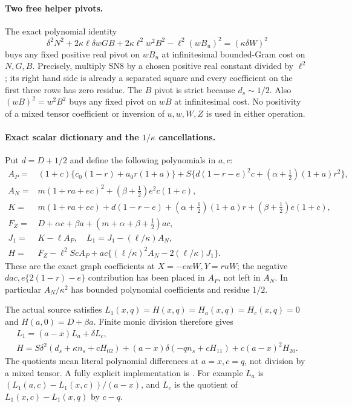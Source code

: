 \paragraph{Two free helper pivots.}
The exact polynomial identity
\[
 \delta^2N^2+2\kappa\ell\delta wGB
       +2\kappa\ell^2w^2B^2-\ell^2(wB_u)^2
                  =(\kappa\delta W)^2
 \tag{SN8}
\]
buys any fixed positive real pivot on $wB_u$ at infinitesimal
bounded-Gram cost on $N,G,B$. Precisely, multiply SN8 by a chosen
positive real constant divided by $\ell^2$; its right hand side is
already a separated square and every coefficient on the first three
rows has zero residue. The $B$ pivot is strict because $d_s\sim1/2$.
Also $(wB)^2=w^2B^2$ buys any fixed pivot on $wB$ at infinitesimal
cost. No positivity of a mixed tensor coefficient or inversion of
$u,w,W,Z$ is used in either operation.

\paragraph{Exact scalar dictionary and the $1/\kappa$ cancellations.}
Put $d=D+1/2$ and define the following polynomials in $a,c$:
\[
\begin{split}
 A_P={}&(1+c)\{c_0(1-r)+a_0r(1+a)\}
       +S\{d(1-r-e)^2c+(\alpha+\tfrac12)(1+a)r^2\},\\
 A_N={}&m(1+ra+ec)^2+(\beta+\tfrac12)e^2c(1+c),\\
 K={}&m(1+ra+ec)+d(1-r-e)
       +(\alpha+\tfrac12)(1+a)r+(\beta+\tfrac12)e(1+c),\\
 F_Z={}&D+\alpha c+\beta a+(m+\alpha+\beta+\tfrac12)ac,\\
 J_1={}&K-\ell A_P,\quad L_1=J_1-(\ell/\kappa)A_N,\\
 H={}&F_Z-\ell^2ScA_P
                 +ac\{(\ell/\kappa)^2A_N-2(\ell/\kappa)J_1\}.
\end{split}\tag{SN9}
\]
These are the exact graph coefficients at $X=-ewW,Y=ruW$;
the negative $dac,e\{2(1-r)-e\}$ contribution has been placed
in $A_P$, not left in $A_N$. In particular $A_N/\kappa^2$ has
bounded polynomial coefficients and residue $1/2$.

The actual source satisfies
$L_1(x,q)=H(x,q)=H_a(x,q)=H_c(x,q)=0$ and
$H(a,0)=D+\beta a$. Finite monic division therefore gives
\[
\begin{gathered}
 L_1=(a-x)L_a+\delta L_c,\\
 H=S\delta^2(d_s+\kappa n_s+cH_{02})
        +(a-x)\delta(-qn_s+cH_{11})+c(a-x)^2H_{20}.
\end{gathered}\tag{SN10}
\]
The quotients mean literal polynomial differences at $a=x,c=q$,
not division by a mixed tensor. A fully explicit implementation is
. For example $L_a$ is
$(L_1(a,c)-L_1(x,c))/(a-x)$, and $L_c$ is the quotient of
$L_1(x,c)-L_1(x,q)$ by $c-q$.

